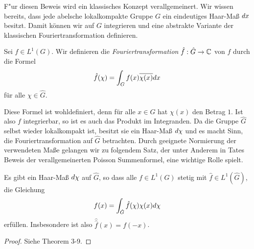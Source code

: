 	F"ur diesen Beweis wird ein klassisches Konzept verallgemeinert.
	Wir wissen bereits, dass jede abelsche lokalkompakte Gruppe $G$ ein eindeutiges Haar-Maß $\dx$ besitzt.
	Damit können wir auf $G$ integrieren und eine abstrakte Variante der klassischen Fouriertransformation definieren.
	\begin{defi}
		Sei $f\in L^1(G)$. 
		Wir definieren die \emph{Fouriertransformation} $\hat{f}: \hat{G} \to \Komplex$ von $f$ durch die Formel
		\begin{align*}
			\hat{f}(\chi) = \int_G f(x)\conj{\chi(x)} \dx
		\end{align*}
		für alle $\chi\in \hat{G}$.
	\end{defi}
	Diese Formel ist wohldefiniert, denn für alle $x \in G$ hat $\chi(x)$ den Betrag $1$. 
	Ist also $f$ integrierbar, so ist es auch das Produkt im Integranden.
	Da die Gruppe $\hat{G}$ selbst wieder lokalkompakt ist, besitzt sie ein Haar-Maß $\dx[\chi]$ und es macht Sinn, die Fouriertransformation auf $\hat{G}$ betrachten.
	Durch geeignete Normierung der verwendeten Maße gelangen wir zu folgendem Satz, der unter Anderem in Tates Beweis der verallgemeinerten Poisson Summenformel, eine wichtige Rolle spielt.
	\begin{satz}\label{satz:topogroup:umkehrformel}
		Es gibt ein Haar-Maß $\dx[\chi]$ auf $\hat{G}$, so dass alle $f \in L^1(G)$ stetig mit $\hat{f} \in L^1(\hat{G})$, die Gleichung
		\begin{align*}
			f(x) = \int_{\hat{G}} \hat{f}(\chi) \chi(x) \dx[\chi]
		\end{align*}
		erfüllen. 
		Insbesondere ist also $\hat{\hat{f}}(x) = f(-x)$.
	\end{satz}
	\begin{proof}
		Siehe \textcite{rama} Theorem 3-9.
	\end{proof}

	
	

